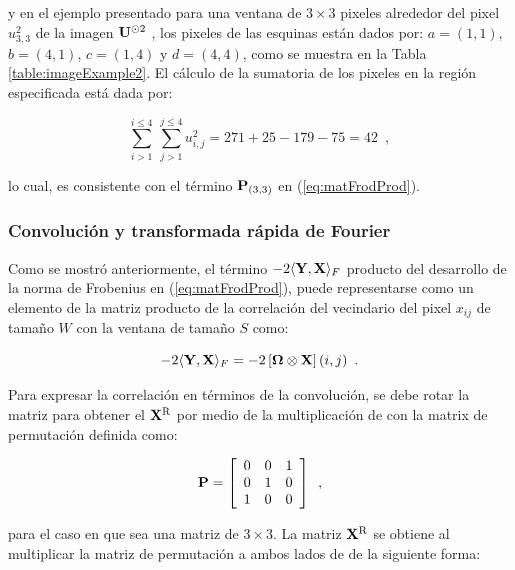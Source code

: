 y en el ejemplo presentado para una ventana de $3\times3$ pixeles alrededor del pixel $u_{3,3}^2$ de la imagen $\mathbf{U}^{\odot2}$ , los pixeles de las esquinas están dados por: $a=\left(1,1\right)$, $b=\left(4,1\right)$,
$c=\left(1,4\right)$ y $d=\left(4,4\right)$, como se muestra en la Tabla \ref{table:imageExample2}. El cálculo de la sumatoria de los pixeles en la región especificada está dada por: 

\begin{equation}
\sum_{i>1}^{i\leq 4}~\sum_{j>1}^{j\leq 4}u_{i,j}^2=271+25-179-75=42 \enspace ,
\end{equation}

lo cual, es consistente con el término $\mathbf{P}_{\left(3,3\right)}$ en (\ref{eq:matFrodProd}). 



\subsubsection{Convolución y transformada rápida de Fourier}

Como se mostró anteriormente, el término $-2\langle\mathbf{Y},\mathbf{X}\rangle_{F}$ producto del desarrollo de la norma de Frobenius en (\ref{eq:matFrodProd}), puede representarse como un elemento de la matriz producto de la correlación del vecindario  del pixel $x_{ij}$ de tama\~no $W$ con la ventana \mat{\Omega} de tama\~no $S$ como:

\begin{equation}
-2\langle\mathbf{Y},\mathbf{X}\rangle_{F} = -2\left[\mathbf{\Omega} \otimes \mathbf{X}\right](i,j) \enspace .
\end{equation}

Para expresar la correlación en términos de la convolución, se debe rotar la matriz  para obtener el $\mathbf{X}^\textrm{R}$ por medio de la multiplicaci\'on de  con la matrix de permutaci\'on definida como:

\begin{equation}
\mathbf{P} = \left[\begin{array}{ccc}
0 & 0 & 1\\
0 & 1 & 0\\
1 & 0 & 0
\end{array}\right] \enspace ,
\end{equation}

para el caso en que  sea una matriz de $3\times 3$. La matriz $\mathbf{X}^\textrm{R}$ se obtiene al multiplicar la matriz de permutaci\'on  a ambos lados de  de la siguiente forma:


